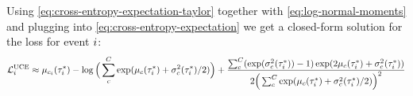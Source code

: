 Using \ref{eq:cross-entropy-expectation-taylor} together with \ref{eq:log-normal-moments} and plugging into \ref{eq:cross-entropy-expectation} we get a closed-form solution for the loss for event $i$:
\small
\begin{equation} \label{eq:gp_loss}
    \mathcal{L}_i^{\text{UCE}}
    \approx \mu_{c_i}(\tau_i^*) - \log \Big( \sum_c^C \exp(\mu_c(\tau_i^*) + \sigma_c^2(\tau_i^*) / 2) \Big) +
        \frac{\sum_c^C (\exp(\sigma_c^2(\tau_i^*)) - 1) \exp(2 \mu_c(\tau_i^*) + \sigma_c^2(\tau_i^*))}
        {2 \Big( \sum_c^C \exp(\mu_c(\tau_i^*) + \sigma_c^2(\tau_i^*) / 2) \Big)^2}
\end{equation}
\normalsize
